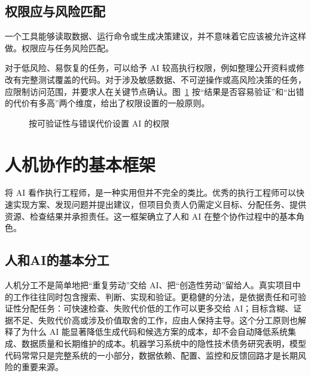 \subsection{权限应与风险匹配}

一个工具能够读取数据、运行命令或生成决策建议，并不意味着它应该被允许这样做。权限应与任务风险匹配。

对于低风险、易恢复的任务，可以给予 AI 较高执行权限，例如整理公开资料或修改有完整测试覆盖的代码。对于涉及敏感数据、不可逆操作或高风险决策的任务，应限制访问范围，并要求人在关键节点确认。图~\ref{fig:ch01_permission} 按“结果是否容易验证”和“出错的代价有多高”两个维度，给出了权限设置的一般原则。

\begin{figure}[H]
  \centering
  \caption{按可验证性与错误代价设置 AI 的权限}
  \label{fig:ch01_permission}
\end{figure}

\section{人机协作的基本框架}

将 AI 看作执行工程师，是一种实用但并不完全的类比。优秀的执行工程师可以快速实现方案、发现问题并提出建议，但项目负责人仍需定义目标、分配任务、提供资源、检查结果并承担责任。这一框架确立了人和 AI 在整个协作过程中的基本角色。

\subsection{人和AI的基本分工}

人机分工不是简单地把“重复劳动”交给 AI、把“创造性劳动”留给人。真实项目中的工作往往同时包含搜索、判断、实现和验证。更稳健的分法，是依据责任和可验证性分配任务：可快速检查、失败代价低的工作可以更多交给 AI；目标含糊、证据不足、失败代价高或涉及价值取舍的工作，应由人保持主导。这个分工原则也解释了为什么 AI 能显著降低生成代码和候选方案的成本，却不会自动降低系统集成、数据质量和长期维护的成本。机器学习系统中的隐性技术债务研究表明，模型代码常常只是完整系统的一小部分，数据依赖、配置、监控和反馈回路才是长期风险的重要来源\cite{sculley2015hidden}。

